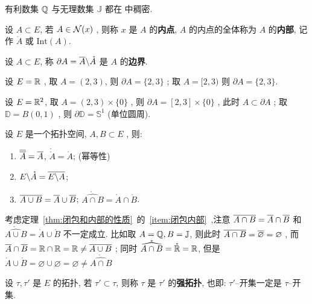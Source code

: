  \begin{Ex}
      有利数集 $ \Q $ 与无理数集 $ \mathbb{J} $ 都在 \R 中稠密. 
 \end{Ex}
 \begin{Def}[内部]\label{def:内部}
       设 $ A\subset E $, 若 $ A\in\CN{x} $ , 则称 $ x $ 是 $ A $ 的\textbf{内点},  $ A $ 的内点的全体称为 $ A $ 的\textbf{内部}, 记作 $ \mathring{A} $ 或 $ \mathrm{Int}(A) $.  
 \end{Def}
 \begin{Def}[边界]\label{def:边界}
       设 $ A\subset E $, 称 $ \partial A = \baro{A}\bs\mathring{A} $ 是 $ A $ 的\textbf{边界}.
 \end{Def}
 \begin{Ex}
      设 $ E=\R $ , 取 $ A = (2, 3) $, 则 $ \partial A = \{ 2, 3 \} $ ; 取 $ A = [2, 3) $ 则 $ \partial A = \{ 2, 3 \} $. 
      
      设 $ E = \R^{2} $, 取 $ A = (2, 3)\times \{0\} $ , 则 $ \partial A = [2, 3]\times \{0\} $ , 此时 $ A\subset \partial A $  ; 取 $ \mathbb{D}=B(0, 1) $ , 则 $ \partial \mathbb{D}=\mathbb{S}^{1} $ (单位圆周). 
 \end{Ex}
 \begin{Thm}\label{thm:闭包和内部的性质}
       设 $ E $ 是一个拓扑空间, $ A, B\subset E $ , 则:
       \begin{enumerate}[(1)]
            \item $ \baro{\baro{A}}=\baro{A} $, $ \mathring{\mathring{A}}=\mathring{A} $; (幂等性)
            \item $ E\bs\mathring{A}=\overline{E\bs A} $;
            \item \label{item:闭包内部}$ \overline {A\cup B}=\baro{A}\cup \baro{B} $; $ \mathring{\widehat{A\cap B}}=\mathring{A}\cap\mathring{B} $.   
       \end{enumerate}
 \end{Thm}
 \begin{Rmk}
      考虑定理~\ref{thm:闭包和内部的性质}~的~\ref{item:闭包内部}~,注意 $ \overline {A\cap B}=\baro{A}\cap \baro{B} $ 和 $ \mathring{\widehat{A\cup B}}=\mathring{A}\cup\mathring{B} $ 不一定成立. 比如取 $ A=\Q, B=\mathbb{J} $, 则此时 $ \overline{A\cap B}=\baro{\varnothing}=\varnothing $  , 而 $ \baro{A}\cap \baro{B}=\R\cap\R=\R\neq\overline {A\cup B} $ ; 同时 $ \mathring{\widehat{A\cap B}}=\mathring{\R}=\R $, 但是 $ \mathring{A}\cup\mathring{B}=\varnothing\cup\varnothing=\varnothing\neq \mathring{\widehat{A\cap B}} $  
 \end{Rmk}
 \begin{Def}[拓扑比较]\label{def:拓扑比较}
       设 $ \tau, \tau' $ 是 $ E $ 的拓扑, 若 $ \tau'\subset\tau $, 则称 $ \tau $ 是 $ \tau' $ 的\textbf{强拓扑}, 也即: $ \tau' $--开集一定是 $ \tau $--开集.   
 \end{Def}
